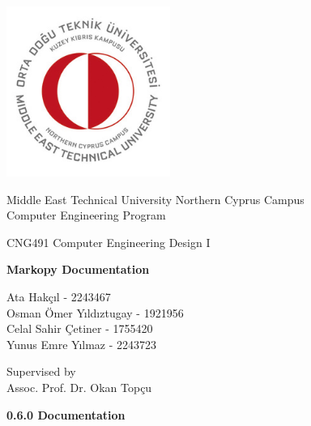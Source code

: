 \let\mypdfximage\pdfximage\def\pdfximage{\immediate\mypdfximage}\documentclass[twoside]{book}
\newcommand{\+}{\discretionary{\mbox{\scriptsize$\hookleftarrow$}}{}{}}
\begin{document}
\hypersetup{pageanchor=false,
             bookmarksnumbered=true,
             pdfencoding=unicode
            }
\begin{titlepage}
\begin{center}
    
    \includegraphics[width=0.4\textwidth]{university}
        
    \Large
    Middle East Technical University Northern Cyprus Campus\\
    Computer Engineering Program\\
    
    \vspace{2cm}
    
    CNG491 Computer Engineering Design I
    
    \vspace{2cm}
    
    \Large
    \textbf{Markopy Documentation}
    
    \vspace{2cm}
    
    \large   
    Ata Hakçıl - 2243467\\
    Osman Ömer Yıldıztugay - 1921956\\ 
    Celal Sahir Çetiner - 1755420\\
    Yunus Emre Yılmaz - 2243723\\

    
    \vspace{2cm}
    
    \large   
    Supervised by\\
    Assoc. Prof. Dr. Okan Topçu\\
    
    \vfill
        
    \large
    
    \textbf{0.6.0 Documentation}
    
\end{center}
\end{titlepage}
\tableofcontents
{}
\hypersetup{pageanchor=true}
\end{document}
